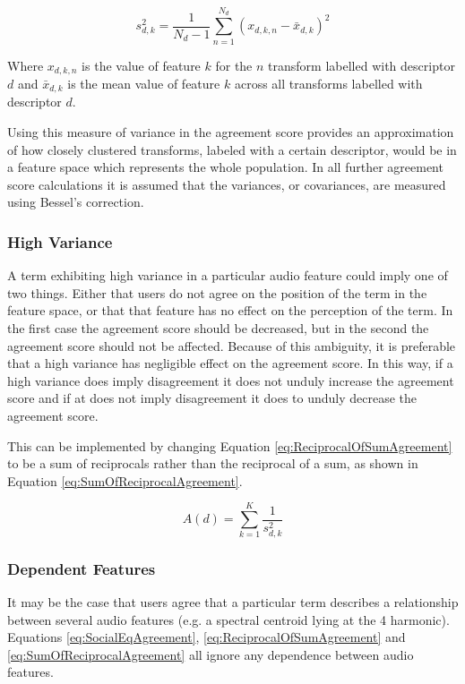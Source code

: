 			\begin{equation}
				s_{d,k}^{2} = \frac{1}{N_{d} - 1} \sum_{n = 1}^{N_{d}} (x_{d,k,n} - \bar{x}_{d,k})^{2}
				\label{eq:UnbiasedVariance}
			\end{equation}

			Where $x_{d,k,n}$ is the value of feature $k$ for the $n$ transform labelled with
			descriptor $d$ and $\bar{x}_{d,k}$ is the mean value of feature $k$ across all transforms labelled
			with descriptor $d$.

			Using this measure of variance in the agreement score provides an approximation of how closely
			clustered transforms, labeled with a certain descriptor, would be in a feature space which
			represents the whole population. In all further agreement score calculations it is assumed that the
			variances, or covariances, are measured using Bessel's correction.

		\subsubsection*{High Variance}
			A term exhibiting high variance in a particular audio feature could imply one of two things. Either
			that users do not agree on the position of the term in the feature space, or that that feature has
			no effect on the perception of the term. In the first case the agreement score should be decreased,
			but in the second the agreement score should not be affected. Because of this ambiguity, it is
			preferable that a high variance has negligible effect on the agreement score. In this way, if a
			high variance does imply disagreement it does not unduly increase the agreement score and if at
			does not imply disagreement it does to unduly decrease the agreement score.
			
			This can be implemented by changing Equation \ref{eq:ReciprocalOfSumAgreement} to be a sum of
			reciprocals rather than the reciprocal of a sum, as shown in Equation
			\ref{eq:SumOfReciprocalAgreement}.

			\begin{equation}
				A(d) = \sum_{k = 1}^{K} \frac{1}{s_{d,k}^{2}}
				\label{eq:SumOfReciprocalAgreement}
			\end{equation}

		\subsubsection*{Dependent Features}
			It may be the case that users agree that a particular term describes a relationship between several
			audio features (e.g. a spectral centroid lying at the 4 harmonic). Equations
			\ref{eq:SocialEqAgreement}, \ref{eq:ReciprocalOfSumAgreement} and \ref{eq:SumOfReciprocalAgreement}
			all ignore any dependence between audio features.

